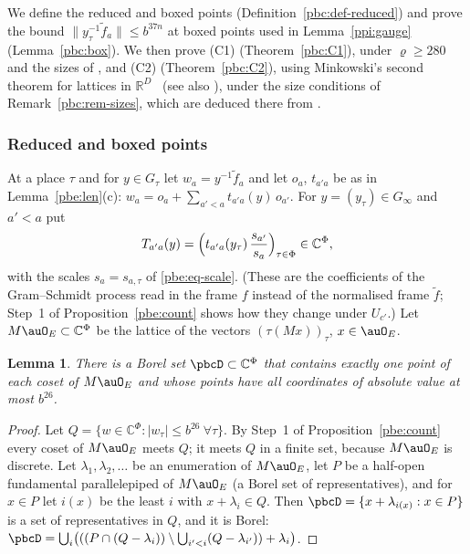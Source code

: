 \documentclass[10pt]{amsart}
\newtheorem{lemma}[theorem]{Lemma}
\theoremstyle{definition}
\theoremstyle{remark}
\newcommand{\C}{\mathbb C}
\newcommand{\R}{\mathbb R}
\providecommand{\auPl}{\Phi}
\begin{document}
We define the reduced and boxed points (Definition~\ref{pbc:def-reduced}) and prove the bound
$\|y_\tau^{-1}\tilde f_a\|\le b^{37n}$ at boxed points used in Lemma~\ref{ppi:gauge} (Lemma~\ref{pbc:box}).
We then prove (C1) (Theorem~\ref{pbc:C1}), under $\varrho\ge280$ and the sizes of {\cite[Lemma~13.4]{P46}},
and (C2) (Theorem~\ref{pbc:C2}), using Minkowski's second theorem for lattices in
$\R^D$~\cite[Chapter~VIII, \S4.3, Theorem~V]{Cassels} (see also \cite[Theorem~1.3]{HenkMinima}), under the
size conditions of Remark~\ref{pbc:rem-sizes}, which are deduced there from {\cite[Lemma~13.4]{P46}}.

\subsubsection{Reduced and boxed points}\label{pbc:ss-box}

At a place $\tau$ and for $y\in G_\tau$ let $w_a=y^{-1}\tilde f_a$ and let $o_a$, $t_{a'a}$ be as in
Lemma~\ref{pbe:len}(c): $w_a=o_a+\sum_{a'<a}t_{a'a}(y)\,o_{a'}$. For $y=(y_\tau)\in G_\infty$ and
$a'<a$ put
\[
T_{a'a}(y)=\Bigl(t_{a'a}(y_\tau)\,\frac{s_{a'}}{s_a}\Bigr)_{\tau\in\auPl}\in\C^{\auPl},
\]
with the scales $s_a=s_{a,\tau}$ of \eqref{pbe:eq-scale}. (These are the coefficients of the
Gram--Schmidt process read in the frame $f$ instead of the normalised frame $\tilde f$; Step~1 of
Proposition~\ref{pbe:count} shows how they change under $U_{c'}$.) Let $M\auO_E\subset\C^{\auPl}$ be the
lattice of the vectors $(\tau(Mx))_\tau$, $x\in\auO_E$.

\begin{lemma}\label{pbc:domain}
There is a Borel set $\pbcD\subset\C^{\auPl}$ that contains exactly one point of each coset of
$M\auO_E$ and whose points have all coordinates of absolute value at most $b^{26}$.
\end{lemma}
\begin{proof}
Let $Q=\{w\in\C^{\auPl}:|w_\tau|\le b^{26}\ \forall\tau\}$. By Step~1 of Proposition~\ref{pbe:count}
every coset of $M\auO_E$ meets $Q$; it meets $Q$ in a finite set, because $M\auO_E$ is discrete. Let
$\lambda_1,\lambda_2,\dots$ be an enumeration of $M\auO_E$, let $P$ be a half-open fundamental
parallelepiped of $M\auO_E$ (a Borel set of representatives), and for $x\in P$ let $i(x)$ be the least
$i$ with $x+\lambda_i\in Q$. Then $\pbcD=\{x+\lambda_{i(x)}:x\in P\}$ is a set of representatives in
$Q$, and it is Borel: $\pbcD=\bigcup_i\bigl(((P\cap(Q-\lambda_i))\setminus\bigcup_{i'<i}(Q-
\lambda_{i'}))+\lambda_i\bigr)$.
\end{proof}
\end{document}
